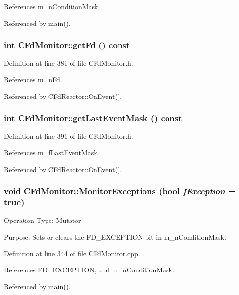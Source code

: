 References m\_\-n\-Condition\-Mask.

Referenced by main().
\subsubsection{\setlength{\rightskip}{0pt plus 5cm}int CFd\-Monitor::get\-Fd () const\hspace{0.3cm}{\tt  [inline]}}\label{classCFdMonitor_a5}




Definition at line 381 of file CFd\-Monitor.h.

References m\_\-n\-Fd.

Referenced by CFd\-Reactor::On\-Event().
\subsubsection{\setlength{\rightskip}{0pt plus 5cm}int CFd\-Monitor::get\-Last\-Event\-Mask () const\hspace{0.3cm}{\tt  [inline]}}\label{classCFdMonitor_a7}




Definition at line 391 of file CFd\-Monitor.h.

References m\_\-f\-Last\-Event\-Mask.

Referenced by CFd\-Reactor::On\-Event().
\subsubsection{\setlength{\rightskip}{0pt plus 5cm}void CFd\-Monitor::Monitor\-Exceptions (bool {\em f\-Exception} = true)}\label{classCFdMonitor_a10}


Operation Type: Mutator

Purpose: Sets or clears the FD\_\-EXCEPTION bit in m\_\-n\-Condition\-Mask. 

Definition at line 344 of file CFd\-Monitor.cpp.

References FD\_\-EXCEPTION, and m\_\-n\-Condition\-Mask.

Referenced by main().
